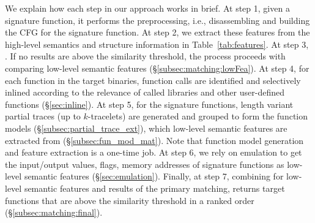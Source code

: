 We explain how each step in our approach works in brief. At step 1, given a signature function, it performs the preprocessing, i.e., disassembling  and building the CFG for the signature function.
At step 2, we extract these features from the high-level semantics and structure information in Table~\ref{tab:features}. 
At step 3, .
If no results are above the similarity threshold, the process proceeds with comparing low-level semantic features (\S\ref{subsec:matching:lowFea}). At step 4, for each function in the target binaries, function calls are identified and selectively inlined according to the relevance of called libraries and other user-defined functions (\S\ref{sec:inline}). 
At step 5, for the signature functions, length variant partial traces (up to $k$-tracelets) are generated  and grouped to form the function models (\S\ref{subsec:partial_trace_ext}), which  low-level semantic features are extracted from (\S\ref{subsec:fun_mod_mat}). %
Note that function model generation and feature extraction is a one-time job.
At step 6, we rely on emulation to get the input/output values, flags, memory addresses of signature functions as low-level semantic features (\S\ref{sec:emulation}).
Finally, at step 7, combining  for low-level semantic features and results of the primary matching, \toolNew returns target functions that are above the similarity threshold in a ranked order (\S\ref{subsec:matching:final}). %

